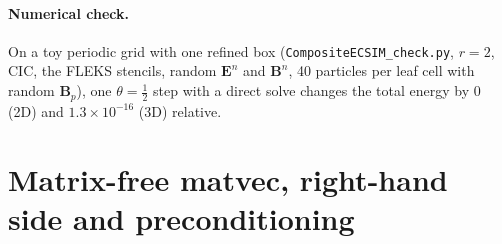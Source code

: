 \documentclass[a4paper,11pt]{article}
\newcommand{\code}[1]{\texttt{#1}}
\begin{document}
\paragraph{Numerical check.} On a toy periodic grid with one refined box
(\code{CompositeECSIM\_check.py}, $r=2$, CIC, the FLEKS stencils, random $\mathbf{E}^n$
and $\mathbf{B}^n$, 40 particles per leaf cell with random $\mathbf{B}_p$), one $\theta=\frac12$
step with a direct solve changes the total energy by $0$ (2D) and
$1.3\times10^{-16}$ (3D) relative.

\section{Matrix-free matvec, right-hand side and preconditioning}\label{sec:matvec}
\end{document}
